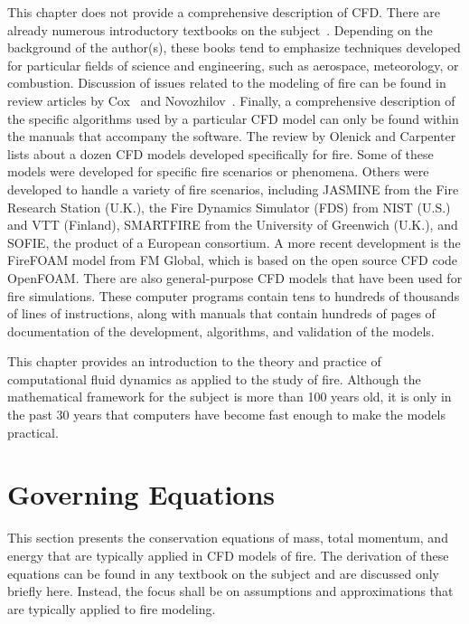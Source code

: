 \documentclass[graybox]{svmult}
\begin{document}
This chapter does not provide a comprehensive description of CFD. There are already numerous introductory textbooks on the subject~\cite{Anderson, Ferziger, Patankar, Peyret, Versteeg}. Depending on the background of the author(s), these books tend to emphasize techniques developed for particular fields of science and engineering, such as aerospace, meteorology, or combustion. Discussion of issues related to the modeling of fire can be found in review articles by Cox~\cite{Cox:1995,Cox:1998}  and Novozhilov~\cite{Novozhilov}. Finally, a comprehensive description of the specific algorithms used by a particular CFD model can only be found within the manuals that accompany the software. The review by Olenick and Carpenter~\cite{Olenick} lists about a dozen CFD models developed specifically for fire. Some of these models were developed for specific fire scenarios or phenomena. Others were developed to handle a variety of fire scenarios, including JASMINE from the Fire Research Station (U.K.), the Fire Dynamics Simulator (FDS) from NIST (U.S.) and VTT (Finland), SMARTFIRE from the University of Greenwich (U.K.), and SOFIE, the product of a European consortium. A more recent development is the FireFOAM model from FM Global, which is based on the open source CFD code OpenFOAM. There are also general-purpose CFD models that have been used for fire simulations. These computer programs contain tens to hundreds of thousands of lines of instructions, along with manuals that contain hundreds of pages of documentation of the development, algorithms, and validation of the models.

This chapter provides an introduction to the theory and practice of computational fluid dynamics as applied to the study of fire. Although the mathematical framework for the subject is more than 100 years old, it is only in the past 30 years that computers have become fast enough to make the models practical.


\section{Governing Equations}

This section presents the conservation equations of mass, total momentum, and energy that are typically applied in CFD models of fire. The derivation of these equations can be found in any textbook on the subject and are discussed only briefly here. Instead, the focus shall be on assumptions and approximations that are typically applied to fire modeling.
\end{document}
